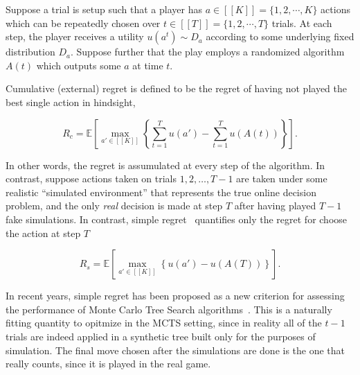 \documentclass[runningheads,a4paper]{llncs}
\newcommand{\bE}{\mathbb{E}}
\begin{document}
Suppose a trial is setup such that a player has $a \in [[K]] = \{ 1, 2, \cdots , K \}$ actions which can be 
repeatedly chosen over $t \in [[T]] = \{ 1, 2, \cdots, T \}$ trials. 
At each step, the player receives a utility $u(a^t) \sim D_a$ according to some underlying fixed 
distribution $D_a$. Suppose further that the play employs a randomized algorithm $A(t)$ which outputs
some $a$ at time $t$. 

Cumulative (external) regret is defined to be the regret of having not played the best single action 
in hindsight, 

\begin{equation}
R_c = \bE \left[ \max_{a' \in [[K]]} \left\{ \sum_{t=1}^T u(a') - \sum_{t=1}^T u(A(t)) \right\} \right].
\end{equation}

In other words, the regret is assumulated at every step of the algorithm. In contrast, 
suppose actions taken on trials $1, 2, \ldots, T-1$ are taken under some realistic ``simulated environment''
that represents the true online decision problem, and the only {\it real} decision is made at step $T$ 
after having played $T-1$ fake simulations. In contrast, simple regret~\cite{Bubeck11Pure} quantifies only 
the regret for choose the action at step $T$

\begin{equation}
R_s = \bE \left[  \max_{a' \in [[K]]} \left\{ u(a') - u(A(T)) \right\} \right].
\end{equation}

In recent years, simple regret has been proposed as a new criterion for assessing the performance of 
Monte Carlo Tree Search algorithms~\cite{Tolpin12MCTSSR,Feldman12BRUE}. This is a naturally fitting quantity 
to opitmize in the MCTS setting, since in reality all of the $t-1$ trials are indeed applied in a synthetic
tree built only for the purposes of simulation. The final move chosen after the simulations are done is the 
one that really counts, since it is played in the real game. 
\end{document}
